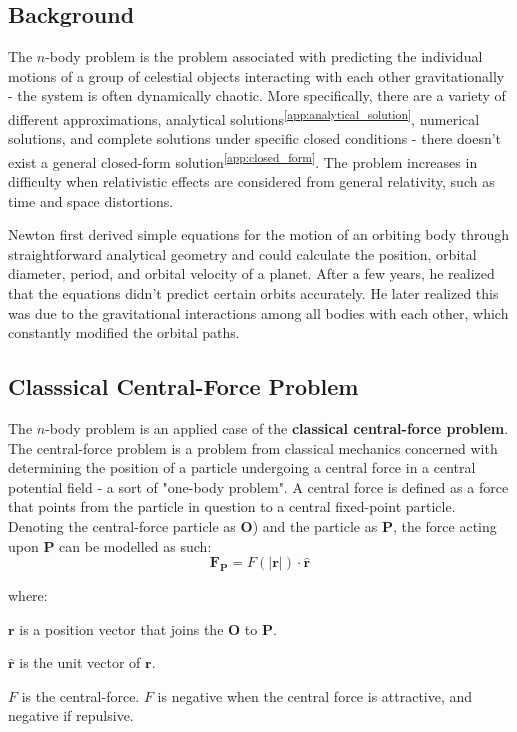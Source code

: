 \documentclass[12pt]{article}
\newcommand{\sref}[1]{\textsuperscript{\ref{#1}}}
\begin{document}
\begin{spacing}{1.25}
\subsection{Background}
\par {
    The \(n\)-body problem is the problem associated with predicting the individual motions of a group of celestial objects interacting with each other gravitationally - the system is often dynamically chaotic. More specifically, there are a variety of different approximations, analytical solutions\sref{app:analytical_solution}, numerical solutions, and complete solutions under specific closed conditions - there doesn't exist a general closed-form solution\sref{app:closed_form}. The problem increases in difficulty when relativistic effects are considered from general relativity, such as time and space distortions.

    Newton first derived simple equations for the motion of an orbiting body through straightforward analytical geometry and could calculate the position, orbital diameter, period, and orbital velocity of a planet. After a few years, he realized that the equations didn't predict certain orbits accurately. He later realized this was due to the gravitational interactions among all bodies with each other, which constantly modified the orbital paths. 
}

\subsection{Classsical Central-Force Problem}
\par {
    The \(n\)-body problem is an applied case of the \textbf{classical central-force problem}. The central-force problem is a problem from classical mechanics concerned with determining the position of a particle undergoing a central force in a central potential field - a sort of "one-body problem". A central force is defined as a force that points from the particle in question to a central fixed-point particle. Denoting the central-force particle as \(\mathbf{O}\)) and the particle as \(\mathbf{P}\), the force acting upon \(\mathbf{P}\) can be modelled as such:
    \begin{equation}
        \mathbf{F}_\mathbf{P} = F(|\mathbf{r}|) \cdot \mathbf{\hat{r}}
    \end{equation}

    \noindent where:
    \begin{slist}
        \item \(\mathbf{r}\) is a position vector that joins the \(\mathbf{O}\) to \(\mathbf{P}\).
        \item \(\mathbf{\hat{r}}\) is the unit vector of \(\mathbf{r}\).
        \item \(F\) is the central-force. \(F\) is negative when the central force is attractive, and negative if repulsive.
    \end{slist}
    
}
\end{spacing}
\end{document}
